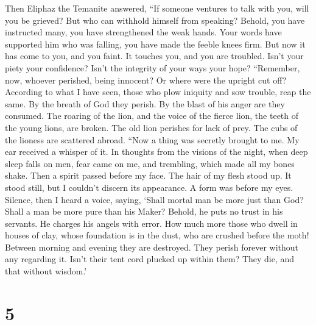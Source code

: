  Then Eliphaz the Temanite answered,  ``If
someone ventures to talk with you, will you be grieved? But who can
withhold himself from speaking?  Behold, you have instructed
many, you have strengthened the weak hands.  Your words have
supported him who was falling, you have made the feeble knees firm.
 But now it has come to you, and you faint. It touches you,
and you are troubled.  Isn't your piety your confidence?
Isn't the integrity of your ways your hope?  ``Remember,
now, whoever perished, being innocent? Or where were the upright cut
off?  According to what I have seen, those who plow iniquity
and sow trouble, reap the same.  By the breath of God they
perish. By the blast of his anger are they consumed.  The
roaring of the lion, and the voice of the fierce lion, the teeth of the
young lions, are broken.  The old lion perishes for lack of
prey. The cubs of the lioness are scattered abroad.  ``Now
a thing was secretly brought to me. My ear received a whisper of it.
 In thoughts from the visions of the night, when deep sleep
falls on men,  fear came on me, and trembling, which made
all my bones shake.  Then a spirit passed before my face.
The hair of my flesh stood up.  It stood still, but I
couldn't discern its appearance. A form was before my eyes. Silence,
then I heard a voice, saying,  `Shall mortal man be more
just than God? Shall a man be more pure than his Maker? 
Behold, he puts no trust in his servants. He charges his angels with
error.  How much more those who dwell in houses of clay,
whose foundation is in the dust, who are crushed before the moth!
 Between morning and evening they are destroyed. They
perish forever without any regarding it.  Isn't their tent
cord plucked up within them? They die, and that without wisdom.'

\hypertarget{section-4}{%
\section{5}\label{section-4}}

